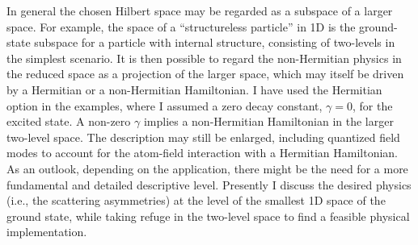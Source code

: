 In general the chosen Hilbert space may  be regarded as a subspace of a larger space. For example,  the space of a ``structureless particle'' in 1D is the ground-state subspace
for a particle with internal structure, consisting of two-levels in the simplest scenario.
It is then possible to regard the non-Hermitian physics in the reduced space
as a projection of the larger space, which may itself be driven by a  Hermitian or a non-Hermitian Hamiltonian.
I have used the Hermitian option in the examples, where I assumed a zero decay constant, $\gamma=0$, for the excited state.
A non-zero $\gamma$ implies  a non-Hermitian  Hamiltonian in the larger two-level space. The description may still be
enlarged,  including  quantized field modes to account for the atom-field interaction with a Hermitian Hamiltonian.
As an outlook, depending on the application, there might be the need for a more fundamental and detailed descriptive level. Presently I discuss the desired physics (i.e., the scattering asymmetries) at the level of the smallest 1D space of the ground state, while taking refuge in the
two-level space to find a feasible physical implementation.
